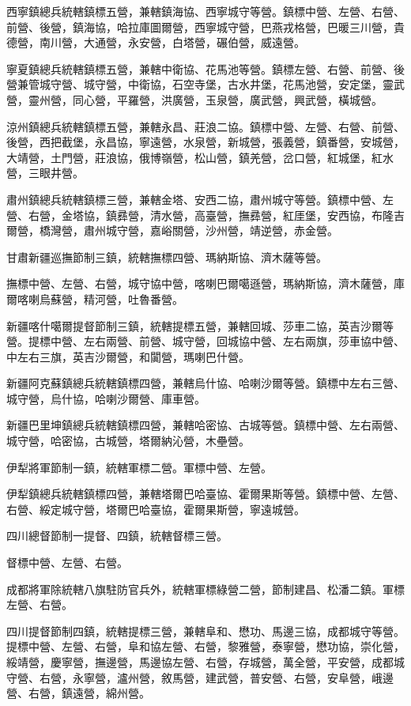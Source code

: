 \begin{pinyinscope}
西寧鎮總兵統轄鎮標五營，兼轄鎮海協、西寧城守等營。鎮標中營、左營、右營、前營、後營，鎮海協，哈拉庫圖爾營，西寧城守營，巴燕戎格營，巴暖三川營，貴德營，南川營，大通營，永安營，白塔營，碾伯營，威遠營。

寧夏鎮總兵統轄鎮標五營，兼轄中衛協、花馬池等營。鎮標左營、右營、前營、後營兼管城守營、城守營，中衛協，石空寺堡，古水井堡，花馬池營，安定堡，靈武營，靈州營，同心營，平羅營，洪廣營，玉泉營，廣武營，興武營，橫城營。

涼州鎮總兵統轄鎮標五營，兼轄永昌、莊浪二協。鎮標中營、左營、右營、前營、後營，西把截堡，永昌協，寧遠營，水泉營，新城營，張義營，鎮番營，安城營，大靖營，土門營，莊浪協，俄博嶺營，松山營，鎮羌營，岔口營，紅城堡，紅水營，三眼井營。

肅州鎮總兵統轄鎮標三營，兼轄金塔、安西二協，肅州城守等營。鎮標中營、左營、右營，金塔協，鎮彞營，清水營，高臺營，撫彞營，紅厓堡，安西協，布隆吉爾營，橋灣營，肅州城守營，嘉峪關營，沙州營，靖逆營，赤金營。

甘肅新疆巡撫節制三鎮，統轄撫標四營、瑪納斯協、濟木薩等營。

撫標中營、左營、右營，城守協中營，喀喇巴爾噶遜營，瑪納斯協，濟木薩營，庫爾喀喇烏蘇營，精河營，吐魯番營。

新疆喀什噶爾提督節制三鎮，統轄提標五營，兼轄回城、莎車二協，英吉沙爾等營。提標中營、左右兩營、前營、城守營，回城協中營、左右兩旗，莎車協中營、中左右三旗，英吉沙爾營，和闐營，瑪喇巴什營。

新疆阿克蘇鎮總兵統轄鎮標四營，兼轄烏什協、哈喇沙爾等營。鎮標中左右三營、城守營，烏什協，哈喇沙爾營、庫車營。

新疆巴里坤鎮總兵統轄鎮標四營，兼轄哈密協、古城等營。鎮標中營、左右兩營、城守營，哈密協，古城營，塔爾納沁營，木壘營。

伊犁將軍節制一鎮，統轄軍標二營。軍標中營、左營。

伊犁鎮總兵統轄鎮標四營，兼轄塔爾巴哈臺協、霍爾果斯等營。鎮標中營、左營、右營、綏定城守營，塔爾巴哈臺協，霍爾果斯營，寧遠城營。

四川總督節制一提督、四鎮，統轄督標三營。

督標中營、左營、右營。

成都將軍除統轄八旗駐防官兵外，統轄軍標綠營二營，節制建昌、松潘二鎮。軍標左營、右營。

四川提督節制四鎮，統轄提標三營，兼轄阜和、懋功、馬邊三協，成都城守等營。提標中營、左營、右營，阜和協左營、右營，黎雅營，泰寧營，懋功協，崇化營，綏靖營，慶寧營，撫邊營，馬邊協左營、右營，存城營，萬全營，平安營，成都城守營、右營，永寧營，瀘州營，敘馬營，建武營，普安營、右營，安阜營，峨邊營、右營，鎮遠營，綿州營。


\end{pinyinscope}
